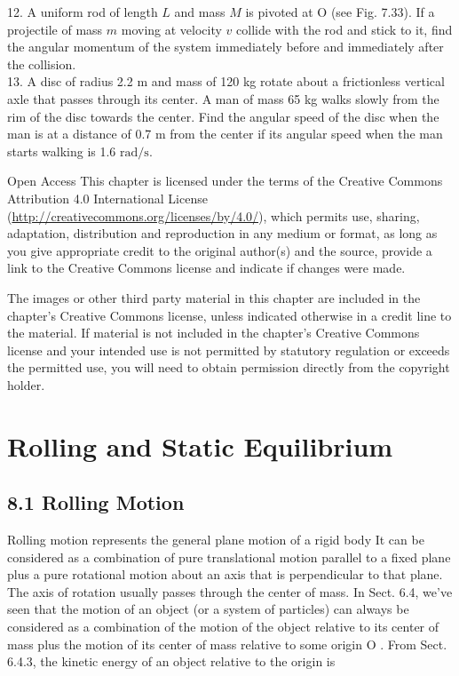 \documentclass[10pt]{article}
\begin{document}
12. A uniform rod of length $L$ and mass $M$ is pivoted at O (see Fig. 7.33). If a projectile of mass $m$ moving at velocity $v$ collide with the rod and stick to it, find the angular momentum of the system immediately before and immediately after the collision.\\
13. A disc of radius 2.2 m and mass of 120 kg rotate about a frictionless vertical axle that passes through its center. A man of mass 65 kg walks slowly from the rim of the disc towards the center. Find the angular speed of the disc when the man is at a distance of 0.7 m from the center if its angular speed when the man starts walking is 1.6 $\mathrm{rad} / \mathrm{s}$.

Open Access This chapter is licensed under the terms of the Creative Commons Attribution 4.0 International License (\href{http://creativecommons.org/licenses/by/4.0/}{http://creativecommons.org/licenses/by/4.0/}), which permits use, sharing, adaptation, distribution and reproduction in any medium or format, as long as you give appropriate credit to the original author(s) and the source, provide a link to the Creative Commons license and indicate if changes were made.

The images or other third party material in this chapter are included in the chapter's Creative Commons license, unless indicated otherwise in a credit line to the material. If material is not included in the chapter's Creative Commons license and your intended use is not permitted by statutory regulation or exceeds the permitted use, you will need to obtain permission directly from the copyright holder.

\section*{Rolling and Static Equilibrium}
\subsection*{8.1 Rolling Motion}
Rolling motion represents the general plane motion of a rigid body It can be considered as a combination of pure translational motion parallel to a fixed plane plus a pure rotational motion about an axis that is perpendicular to that plane. The axis of rotation usually passes through the center of mass. In Sect. 6.4, we've seen that the motion of an object (or a system of particles) can always be considered as a combination of the motion of the object relative to its center of mass plus the motion of its center of mass relative to some origin O . From Sect. 6.4.3, the kinetic energy of an object relative to the origin is
\end{document}
